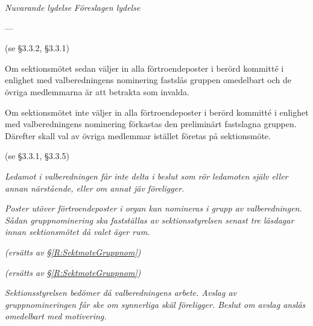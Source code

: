 \documentclass{article}
\newenvironment{lydelse}
    {\begin{paracol}{2}%
        \emph{Nuvarande lydelse}%
        \switchcolumn%
        \emph{Föreslagen lydelse}%
    \end{paracol}%
    \begin{enumerate}[label=\thesubsection.\arabic*]%
    \begin{paracol}{2}%
    }{\end{paracol}\end{enumerate}}
\begin{document}
\begin{lydelse}
    \setcounter{subsection}{3}
    \setcounter{section}{3}

    \item[] ---
    \vspace{5.5ex}
    \item[] (se \S3.3.2, \S3.3.1)
    
    \vspace{11.3ex}\setcounter{enumi}{2}
    \item[]
    \item[]\vspace{1.8em}
    \item Om sektionsmötet sedan väljer in alla förtroendeposter i berörd kommitté i enlighet med valberedningens nominering fastslås gruppen omedelbart och de övriga medlemmarna är att betrakta som invalda.

	\item Om sektionsmötet inte väljer in alla förtroendeposter i berörd kommitté i enlighet med valberedningens nominering förkastas den preliminärt fastslagna gruppen. Därefter skall val av övriga medlemmar istället företas på sektionsmöte.
    
    \item[] (se \S3.3.1, \S3.3.5)
    
    \setcounter{subsection}{0}
    \setcounter{section}{9}
    \switchcolumn
    \item \emph{Ledamot i valberedningen får inte delta i beslut som rör ledamoten själv eller annan närstående, eller om annat jäv föreligger.}
    
    \item \emph{Poster utöver förtroendeposter i organ kan nomineras i grupp av valberedningen.
    Sådan gruppnominering ska fastställas av sektionsstyrelsen senast tre läsdagar innan sektionsmötet då valet äger rum.}
    \label{R:valb:grupp}
    
    \item[] \emph{(ersätts av \S \ref{R:SektmoteGruppnom})}
    \vspace{12ex}

    \item[] \emph{(ersätts av \S \ref{R:SektmoteGruppnom})}
    
    \vspace{4.8em}
    \item \emph{Sektionsstyrelsen bedömer då valberedningens arbete. 
    Avslag av gruppnomineringen får ske om synnerliga skäl föreligger.
    Beslut om avslag anslås omedelbart med motivering.}
\end{lydelse}
\end{document}
